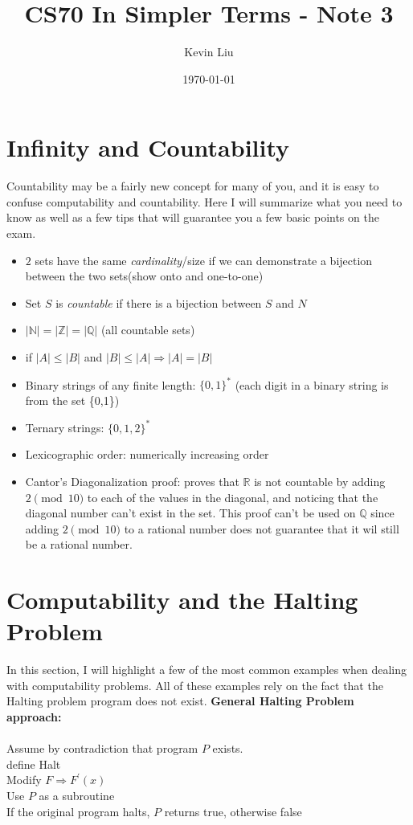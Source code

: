 \documentclass[a4paper]{article}
\title{CS70 In Simpler Terms - Note 3}
\author{Kevin Liu}
\date{\today}
\newcommand{\R}{\mathbb{R}}
\newcommand{\Z}{\mathbb{Z}}
\newcommand{\N}{\mathbb{N}}
\newcommand{\Q}{\mathbb{Q}}
\begin{document}
\maketitle

\section{Infinity and Countability}
Countability may be a fairly new concept for many of you, and it is easy to confuse computability and countability. Here I will summarize what you need to know as well as a few tips that will guarantee you a few basic points on the exam. 
\begin{itemize}
    \item $2$ sets have the same \textit{cardinality}/size if we can demonstrate a bijection between the two sets(show onto and one-to-one)
    \item Set $S$ is \textit{countable} if there is a bijection between $S$ and $N$
    \item $|\N| = |\Z| = |\Q|$ (all countable sets)
    \item if $|A| \leq |B|$ and $|B| \leq |A| \Rightarrow |A| = |B|$
    \item Binary strings of any finite length: $\{0,1\}^*$ (each digit in a binary string is from the set \{0,1\})
    \item Ternary strings: $\{0,1,2\}^*$ 
    \item Lexicographic order: numerically increasing order
    \item Cantor's Diagonalization proof: proves that $\R$ is not countable by adding $2\pmod{10}$ to each of the values in the diagonal, and noticing that the diagonal number can't exist in the set. This proof can't be used on $\Q$ since adding $2\pmod{10}$ to a rational number does not guarantee that it wil still be a rational number.    

\end{itemize}

\section{Computability and the Halting Problem}
In this section, I will highlight a few of the most common examples when dealing with computability problems. All of these examples rely on the fact that the Halting problem program does not exist. 
\textbf{General Halting Problem approach:} \\\\
Assume by contradiction that program $P$ exists.\\
\indent define Halt \\
\indent Modify $F \Rightarrow F^{'}(x)$\\
\indent Use $P$ as a subroutine\\
\indent If the original program halts, $P$ returns true, otherwise false\\
\end{document}

